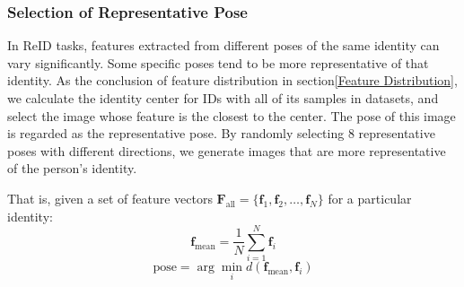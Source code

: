 \subsubsection{Selection of Representative Pose} \label{standard pose}

In ReID tasks, features extracted from different poses of the same identity can vary significantly. Some specific poses tend to be more representative of that identity. As the conclusion of feature distribution in section\ref{Feature Distribution}, we calculate the identity center for IDs with all of its samples in datasets, and select the image whose feature is the closest to the center. The pose of this image is regarded as the representative pose. By randomly selecting 8 representative poses with different directions, we generate images that are more representative of the person’s identity.

That is, given a set of feature vectors \( \mathbf{F}_{\text{all}} = \{ \mathbf{f}_1, \mathbf{f}_2, \dots, \mathbf{f}_N \} \) for a particular identity:
\begin{equation}
\mathbf{f}_{\text{mean}} = \frac{1}{N} \sum_{i=1}^{N} \mathbf{f}_i
\end{equation}
\begin{equation}
\text{pose} = \arg \min_{i}d(\mathbf{f}_{\text{mean}}, \mathbf{f}_i) 
\end{equation}





